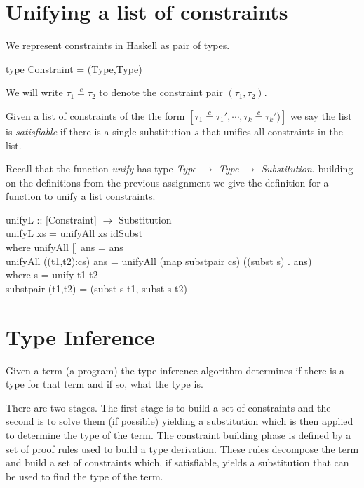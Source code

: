 \documentclass[11pt]{article}
\begin{document}

\section{Unifying a list of constraints}

We represent constraints in Haskell as pair of types.

\begin{program**}
\> type Constraint = (Type,Type)
\end{program**}
We will write $\tau_1\stackrel{c}{=}\tau_2$ to denote the constraint pair
$(\tau_1,\tau_2)$.

\begin{definition}
Given a list of constraints of the the form $[\tau_1\stackrel{c}{=}\tau_1',
\cdots ,\tau_k\stackrel{c}{=}\tau_k')]$ we say the list is {\em{satisfiable}}
if there is a single substitution $s$ that unifies all constraints in the list.
\end{definition}


Recall that the function {\it{unify}} has type {\it{Type $\rightarrow$ Type
$\rightarrow$ Substitution}}.  building on the definitions from the previous
assignment we give the definition for a function to unify a list constraints.

\begin{program**}
\> unifyL :: [Constraint] $\rightarrow$ Substitution \\
\> unifyL xs = unifyAll xs idSubst \\
\>    where unifyAll [] ans = ans \\
\>            unifyAll ((t1,t2):cs) ans = unifyAll (map substpair cs) ((subst s) . ans) \\
\>                where s = unify t1 t2 \\
\>                        substpair (t1,t2) = (subst s t1, subst s t2) \\
\end{program**}



\section{Type Inference}

Given a term (a program) the type inference algorithm determines if there is a
type for that term and if so, what the type is. 

There are two stages.  The first stage is to build a set of constraints and the
second is to solve them (if possible) yielding a substitution which is then
applied to determine the type of the term.  The constraint building phase is
defined by a set of proof rules used to build a type derivation.  These rules
decompose the term and build a set of constraints which, if satisfiable, yields
a substitution that can be used to find the type of the term.
\end{document}
